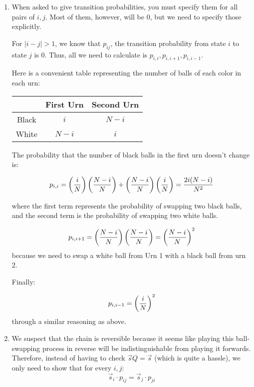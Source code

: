 \documentclass[11.5pt]{article}
\begin{document}
\begin{solution}{3} 
\vspace{-0.5em}
\begin{enumerate}
\item When asked to give transition probabilities, you must specify them for all pairs of $i,j$. Most of them, however, will be 0, but we need to specify those explicitly. 

For $|i - j| > 1$, we know that $p_{ij}$, the transition probability from state $i$ to state $j$ is 0. Thus, all we need to calculate is $p_{i,i}, p_{i,i+1}, p_{i, i-1}$. 

Here is a convenient table representing the number of balls of each color in each urn:  
\begin{center}
\begin{tabular}{ccc}
& First Urn & Second Urn \\ 
\hline
Black & $i$  & $N-i$ \\ 
White & $N-i$ & $i$ 
\end{tabular} 
\end{center}

The probability that the number of black balls in the first urn doesn't change is: 

$$ p_{i,i} = \left( \frac{i}{N} \right)\left( \frac{N-i}{N} \right) + \left( \frac{N-i}{N} \right) \left( \frac{i}{N} \right) = \frac{2i(N-i)}{N^2}$$

where the first term represents the probability of swapping two black balls, and the second term is the probability of swapping two white balls. 

$$ p_{i, i+1} = \left( \frac{N-i}{N} \right) \left( \frac{N-i}{N} \right) = \left( \frac{N-i}{N} \right)^2$$
because we need to swap a white ball from Urn 1 with a black ball from urn 2. 

Finally: 

$$ p_{i, i-1} = \left( \frac{i}{N} \right)^2$$ 
through a similar reasoning as above. 

\item We suspect that the chain is reversible because it seems like playing this ball-swapping process in reverse will be indistinguishable from playing it forwards. Therefore, instead of having to check $\vec{s} Q = \vec{s}$ (which is quite a hassle), we only need to show that for every $i,j$: $$\vec{s}_i \cdot p_{ij} = \vec{s}_j \cdot p_{ji}$$


\end{enumerate}
\end{solution}
\end{document}
